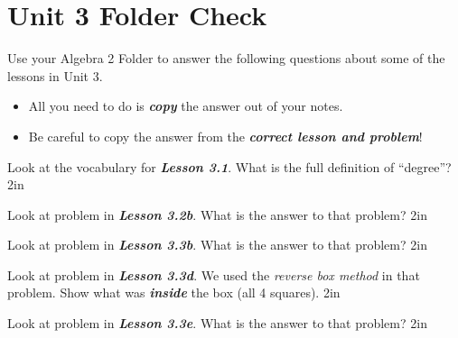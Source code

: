\chapter*{Unit 3 Folder Check}

Use your Algebra 2 Folder to answer the following questions about some of the lessons in Unit 3.
\begin{itemize}[nosep,fullwidth]
    \item All you need to do is {\bfseries\itshape copy} the answer out of your notes.
    \item Be careful to copy the answer from the {\bfseries\itshape correct lesson and problem}!
\end{itemize}

\myWideProblem
    {
        Look at the vocabulary for {\bfseries\itshape Lesson 3.1}.
        What is the full definition of ``degree''?
    }
    {2in}

    \myWideProblem
    {
        Look at problem  in {\bfseries\itshape Lesson 3.2b}.
        What is the answer to that problem?
    }
    {2in}

    \myWideProblem
    {
        Look at problem  in {\bfseries\itshape Lesson 3.3b}.
        What is the answer to that problem?
    }
    {2in}

    \myWideProblem
    {
        Look at problem  in {\bfseries\itshape Lesson 3.3d}.
        We used the {\itshape reverse box method} in that problem.
        Show what was {\bfseries\itshape inside} the box (all 4 squares).
    }
    {2in}

    \myWideProblem
    {
        Look at problem  in {\bfseries\itshape Lesson 3.3e}.
        What is the answer to that problem?
    }
    {2in}
